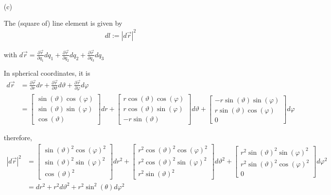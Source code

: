 \documentclass[11pt,a4paper]{article}
\begin{document}
\begin{enumerate}
\newpage

\item[(c)]

The (square of) line element is given by
\begin{align*}
dl:=|d\vec{r}|^2
\end{align*}

with $d\vec{r}=\frac{\partial\vec{r}}{\partial q_1}dq_1+\frac{\partial\vec{r}}{\partial q_2}dq_2+\frac{\partial\vec{r}}{\partial q_3}dq_3$

In spherical coordinates, it is
\begin{align*}
d\vec{r}
&=\frac{\partial\vec{r}}{\partial r}dr+\frac{\partial\vec{r}}{\partial \vartheta}d\vartheta+\frac{\partial\vec{r}}{\partial \varphi}d\varphi \\
&=
\begin{bmatrix}
\sin(\vartheta)\cos(\varphi) \\
\sin(\vartheta)\sin(\varphi) \\
\cos(\vartheta)
\end{bmatrix}
dr
+
\begin{bmatrix}
r\cos(\vartheta)\cos(\varphi) \\
r\cos(\vartheta)\sin(\varphi) \\
-r\sin(\vartheta)
\end{bmatrix}
d\vartheta
+
\begin{bmatrix}
-r\sin(\vartheta)\sin(\varphi) \\
r\sin(\vartheta)\cos(\varphi) \\
0
\end{bmatrix}
d\varphi
\end{align*}

therefore,
\begin{align*}
|d\vec{r}|^2
&=
\begin{bmatrix}
\sin(\vartheta)^2\cos(\varphi)^2 \\
\sin(\vartheta)^2\sin(\varphi)^2 \\
\cos(\vartheta)^2
\end{bmatrix}
dr^2
+
\begin{bmatrix}
r^2\cos(\vartheta)^2\cos(\varphi)^2 \\
r^2\cos(\vartheta)^2\sin(\varphi)^2 \\
r^2\sin(\vartheta)^2
\end{bmatrix}
d\vartheta^2
+
\begin{bmatrix}
r^2\sin(\vartheta)^2\sin(\varphi)^2 \\
r^2\sin(\vartheta)^2\cos(\varphi)^2 \\
0
\end{bmatrix}
d\varphi^2 \\
&=
dr^2+r^2d\vartheta^2+r^2\sin^2(\theta)d\varphi^2
\end{align*}


\end{enumerate}
\end{document}
